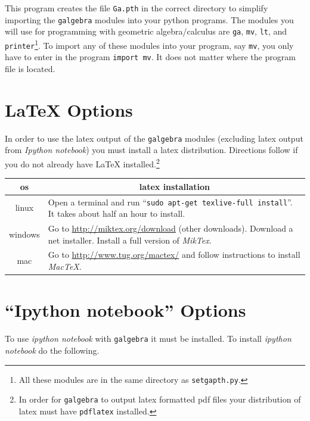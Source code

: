 \documentclass[12pt]{report}
\newcommand{\T}[1]{\texttt{#1}}
\begin{document}
This program creates the file \T{Ga.pth} in the correct directory to simplify importing the \T{galgebra} modules into your python
programs.  The modules you will use for programming with geometric algebra/calculus are \T{ga}, \T{mv}, \T{lt}, and
\T{printer}\footnote{All these modules are in the same directory as \T{setgapth.py}.}.  To import any of these modules into your
program, say \T{mv}, you only have to enter in the program \T{import mv}.  It does not matter where the program file is located.

\section{{\LaTeX} Options}
In order to use the latex output of the \T{galgebra} modules (excluding latex output from \emph{Ipython notebook}) you must install
a latex distribution.  Directions follow if you do not already have {\LaTeX} installed.\footnote{In order for \T{galgebra} to output
 latex formatted pdf files your distribution of latex must have \T{pdflatex} installed.}
\begin{center}
\begin{tabular}{cl}
os & \multicolumn{1}{c}{latex installation} \vspace{5pt} \\ \hline
linux & \parbox{4in}{\vspace{5pt} Open a terminal and run ``\T{sudo apt-get texlive-full install}''.  It takes about half an hour
                     to install.\vspace{5pt}} \\ \hline
windows & \parbox{4in}{\vspace{5pt}Go to \url{http://miktex.org/download} (other downloads). Download a net installer.
                       Install a full version of \emph{MikTex}.\vspace{5pt}}\\  \hline
mac & \parbox{4in}{\vspace{5pt}Go to \url{http://www.tug.org/mactex/} and follow instructions to install
                   \emph{MacTeX}.\vspace{5pt}} \\ \hline
\end{tabular}
\end{center}
\section{``Ipython notebook'' Options}
To use \emph{ipython notebook} with \T{galgebra} it must be installed.  To install \emph{ipython notebook} do the following.
\end{document}
